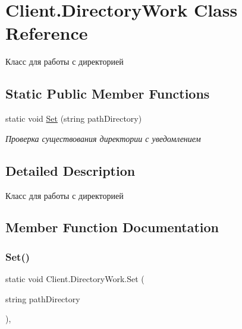 \hypertarget{class_client_1_1_directory_work}{}\section{Client.\+Directory\+Work Class Reference}
\label{class_client_1_1_directory_work}


Класс для работы с директорией  


\subsection*{Static Public Member Functions}
\begin{DoxyCompactItemize}
\item 
static void \hyperlink{class_client_1_1_directory_work_a42fbcc188b41ea61bdb1cc67397b2c69}{Set} (string path\+Directory)
\begin{DoxyCompactList}\small\item\em Проверка существования директории с уведомлением \end{DoxyCompactList}\end{DoxyCompactItemize}


\subsection{Detailed Description}
Класс для работы с директорией 



\subsection{Member Function Documentation}
\hypertarget{class_client_1_1_directory_work_a42fbcc188b41ea61bdb1cc67397b2c69}{}\label{class_client_1_1_directory_work_a42fbcc188b41ea61bdb1cc67397b2c69} 
\subsubsection{\texorpdfstring{Set()}{Set()}}
{\footnotesize\ttfamily static void Client.\+Directory\+Work.\+Set (\begin{DoxyParamCaption}\item[{string}]{path\+Directory }\end{DoxyParamCaption})\hspace{0.3cm}{\ttfamily [inline]}, {\ttfamily [static]}}



